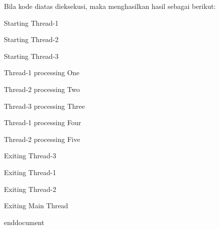 \documentclass [12pt,a4paper,notitlepage,oneside,bahasa]{article}
\begin{document}
Bila kode diatas dieksekusi, maka menghasilkan hasil sebagai berikut: \par
\vspace{12pt}
\noindent 
{\fontsize{10pt}{10pt}\selectfont Starting Thread-1} \par
\noindent 
{\fontsize{10pt}{10pt}\selectfont Starting Thread-2} \par
\noindent 
{\fontsize{10pt}{10pt}\selectfont Starting Thread-3} \par
\noindent 
{\fontsize{10pt}{10pt}\selectfont Thread-1 processing One} \par
\noindent 
{\fontsize{10pt}{10pt}\selectfont Thread-2 processing Two} \par
\noindent 
{\fontsize{10pt}{10pt}\selectfont Thread-3 processing Three} \par
\noindent 
{\fontsize{10pt}{10pt}\selectfont Thread-1 processing Four} \par
\noindent 
{\fontsize{10pt}{10pt}\selectfont Thread-2 processing Five} \par
\noindent 
{\fontsize{10pt}{10pt}\selectfont Exiting Thread-3} \par
\noindent 
{\fontsize{10pt}{10pt}\selectfont Exiting Thread-1} \par
\noindent 
{\fontsize{10pt}{10pt}\selectfont Exiting Thread-2} \par
\noindent 
{\fontsize{10pt}{10pt}\selectfont Exiting Main Thread} \par
\vspace{12pt}

end{document}
\end{document}
